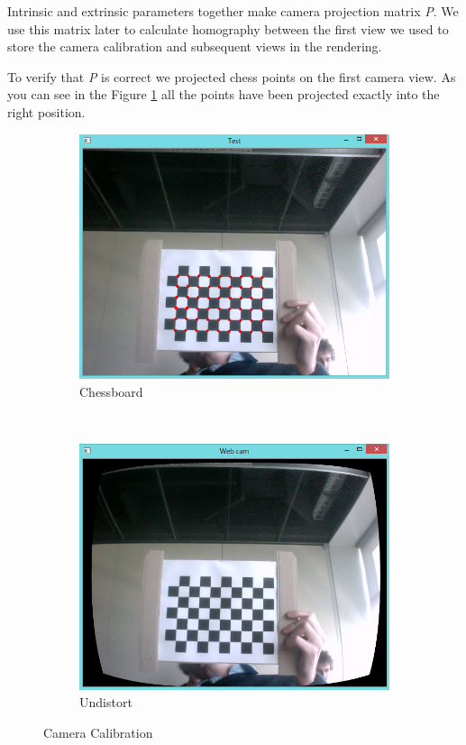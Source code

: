 Intrinsic and extrinsic parameters together make camera projection matrix \textit{P}. We use this matrix later to calculate homography between the first view we used to store the camera calibration and subsequent views in the rendering.

To verify that \textit{P} is correct we projected chess points on the first camera view. As you can see in the Figure \ref{subfig:chesspattern} all the points have been projected exactly into the right position.
 
 \begin{figure}[h!]
	\begin{subfigure}[b]{0.5\textwidth}
		\includegraphics[width=\textwidth]{final/images/patterndot.jpg}
		\caption{Chessboard}
		\label{subfig:chesspattern}
	\end{subfigure}
	~
	\begin{subfigure}[b]{0.5\textwidth}
		\includegraphics[width=\textwidth]{final/images/undistort.jpg}
		\caption{Undistort}
		\label{subfig:undistort}
	\end{subfigure}
	
	\caption{Camera Calibration}
\end{figure}
 
